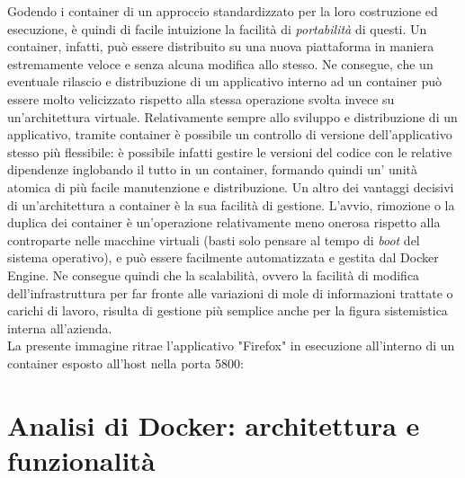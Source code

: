 Godendo i container di un approccio standardizzato per la loro costruzione ed esecuzione, è quindi di facile intuizione la facilità di \textit{portabilità} di questi. Un container, infatti, può essere distribuito su una nuova piattaforma in maniera estremamente veloce e senza alcuna modifica allo stesso. Ne consegue, che un eventuale rilascio e distribuzione di un applicativo interno ad un container può essere molto velicizzato rispetto alla stessa operazione svolta invece su un'architettura virtuale. Relativamente sempre allo sviluppo e distribuzione di un applicativo, tramite container è possibile un controllo di versione dell'applicativo stesso più flessibile: è possibile infatti gestire le versioni del codice con le relative dipendenze inglobando il tutto in un container, formando quindi un' unità atomica di più facile manutenzione e distribuzione.
Un altro dei vantaggi decisivi di un'architettura a container è la sua facilità di gestione. L'avvio, rimozione o la duplica dei container è un'operazione relativamente meno onerosa rispetto alla controparte nelle macchine virtuali (basti solo pensare al tempo di \textit{\gls{boot}} del sistema operativo), e può essere facilmente automatizzata e gestita dal Docker Engine. Ne consegue quindi che la scalabilità, ovvero la facilità di modifica dell'infrastruttura per far fronte alle variazioni di mole di informazioni trattate o carichi di lavoro, risulta di gestione più semplice anche per la figura sistemistica interna all'azienda.
\\
La presente immagine ritrae l'applicativo "Firefox" in esecuzione all'interno di un container esposto all'host nella porta 5800:

\section{Analisi di Docker: architettura e funzionalità}

